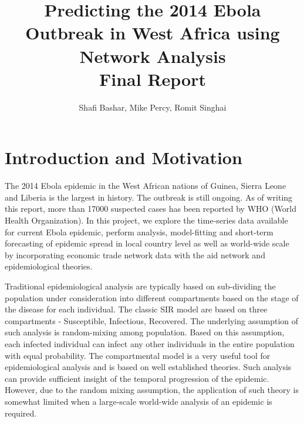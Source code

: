\documentclass[10pt, journal,onecolumn]{IEEEtran}
\title{Predicting the 2014 Ebola Outbreak in West Africa using Network Analysis \\
       {\large Final Report} }
\author{Shafi Bashar, Mike Percy, Romit  Singhai}
\affil{\textit {\{shafiab, mp81, romit\}@stanford.edu}}
\begin{document}
\maketitle



\section{{Introduction and Motivation}}
\label{sec:Introduction}

The 2014 Ebola epidemic in the West African nations of Guinea, Sierra Leone and Liberia is the largest in history. The outbreak is still ongoing.  As of writing this report, more than 17000 suspected cases has been reported by WHO (World Health Organization). In this project, we explore the time-series data available for current Ebola epidemic, perform analysis, model-fitting and short-term forecasting of epidemic spread in local country level as well as world-wide scale by incorporating economic trade network data with the aid network and epidemiological theories.

Traditional epidemiological analysis are typically based on sub-dividing the population under consideration into different compartments based on the stage of the disease for each individual. The classic SIR model are based on three compartments - Susceptible, Infectious, Recovered. The underlying assumption of such analysis is  random-mixing among population. Based on this assumption, each infected individual can infect any other individuals in the entire population with equal probability. The compartmental model is a very useful tool for epidemiological analysis and is based on well established theories. Such analysis can provide sufficient insight of the temporal progression of the epidemic. However, due to the random mixing assumption, the application of such theory is somewhat limited when a large-scale world-wide analysis of an epidemic is required.
\end{document}
